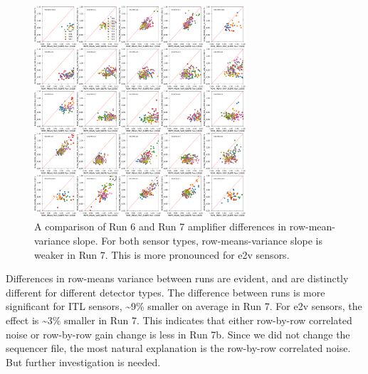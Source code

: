 \begin{figure}[ht]
\begin{centering}
\includegraphics[width=0.7\textwidth]{figures/baselineCharacterization/13550_E1071_ROW_MEAN_VAR_SLOPE.png}
\caption{A comparison of Run 6 and Run 7 amplifier differences in row-mean-variance slope. For both sensor types, row-means-variance slope is weaker in Run 7. This is more pronounced for e2v sensors.}
\end{centering}
\end{figure}

Differences in row-means variance between runs are evident, and are distinctly different for different detector types. The difference between runs is more significant for ITL sensors, \textasciitilde9\% smaller on average in Run 7. For e2v sensors, the effect is \textasciitilde3\% smaller in Run 7. This indicates that either row-by-row correlated noise or row-by-row gain change is less in Run 7b. Since we did not change the sequencer file, the most natural explanation is the row-by-row correlated noise. But further investigation is needed.

